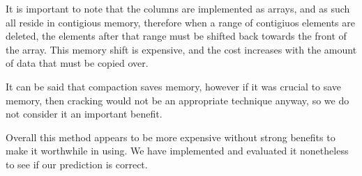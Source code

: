 It is important to note that the columns are implemented as arrays, and as such all reside in
contigious memory, therefore when a range of contigiuos elements are deleted, the elements after
that range must be shifted back towards the front of the array. This memory shift is expensive,
and the cost increases with the amount of data that must be copied over.

It can be said that compaction saves memory, however if it was crucial to save memory, then cracking
would not be an appropriate technique anyway, so we do not consider it an important benefit.

Overall this method appears to be more expensive without strong benefits to make it worthwhile in
using. We have implemented and evaluated it nonetheless to see if our prediction is correct.
